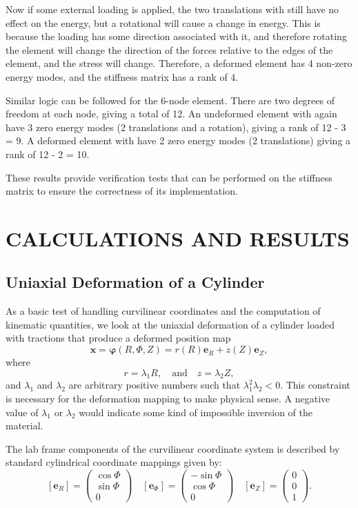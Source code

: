\documentclass[]{spie}  %
\begin{document}
Now if some external loading is applied, the two translations with still have no effect on the energy, but a rotational will cause a change in energy. This is because the loading has some direction associated with it, and therefore rotating the element will change the direction of the forces relative to the edges of the element, and the stress will change. Therefore, a deformed element has 4 non-zero energy modes, and the stiffness matrix has a rank of 4. 

Similar logic can be followed for the 6-node element. There are two degrees of freedom at each node, giving a total of 12. An undeformed element with again have 3 zero energy modes (2 translations and a rotation), giving a rank of 12 - 3 = 9. A deformed element with have 2 zero energy modes (2 translations) giving a rank of 12 - 2 = 10.

These results provide verification tests that can be performed on the stiffness matrix to ensure the correctness of its implementation. 

	
\section{CALCULATIONS AND RESULTS} 

\subsection{Uniaxial Deformation of a Cylinder}
As a basic test of handling curvilinear coordinates and the computation of kinematic quantities, we look at the uniaxial deformation of a cylinder loaded with tractions that produce a deformed position map
\[
\bm{x} = \bm{\varphi}(R,\Phi,Z) = r(R) \bm{e}_R + z(Z) \bm{e}_Z ,
\]
where 
\[
r = \lambda_1 R, \quad \text{and} \quad z = \lambda_2 Z,
\]
and $\lambda_1$ and $\lambda_2$ are arbitrary positive numbers such that $\lambda_1^2\lambda_2<0$. This constraint is necessary for the deformation mapping to make physical sense. A negative value of $\lambda_1$ or $\lambda_2$ would indicate some kind of impossible inversion of the material. 

The lab frame components of the curvilinear coordinate system is described by standard cylindrical coordinate mappings given by:
\[
[\bm{e}_R] = \begin{pmatrix} \cos\Phi \\ \sin\Phi \\ 0 \end{pmatrix}
\quad
[\bm{e}_\Phi] = \begin{pmatrix} -\sin\Phi \\ \cos\Phi \\ 0 \end{pmatrix}
\quad
[\bm{e}_Z] = \begin{pmatrix} 0\\ 0\\ 1 \end{pmatrix}.
\]
\end{document}
